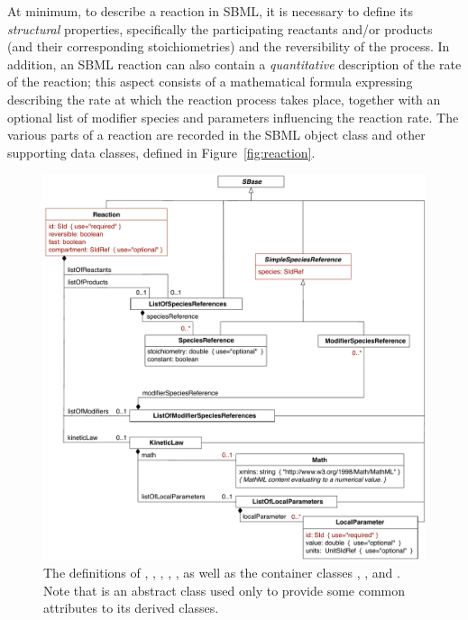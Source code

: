 At minimum, to describe a reaction in SBML, it is necessary to
define its \emph{structural} properties, specifically the
participating reactants and/or products (and their corresponding
stoichiometries) and the reversibility of the process.  In
addition, an SBML reaction can also contain a \emph{quantitative}
description of the rate of the reaction; this aspect consists of a
mathematical formula expressing describing the rate at which the
reaction process takes place, together with an optional list of
modifier species and parameters influencing the reaction rate.
The various parts of a reaction are recorded in the SBML \Reaction
object class and other supporting data classes, defined in
Figure~\vref{fig:reaction}.

\begin{figure}[b]
  \centering
  \includegraphics[scale=0.78]{figs/reaction-uml-v2}
  \caption{The definitions of \Reaction, \KineticLaw,
    \SpeciesReference, \ModifierSpeciesReference, \LocalParameter,
    as well as the container classes \ListOfSpeciesReferences,
    \ListOfModifierSpeciesReferences, and \ListOfLocalParameters.
    Note that \SimpleSpeciesReferenceUpright is an abstract class used
    only to provide some common attributes to its derived
    classes.}
  \label{fig:reaction}
\end{figure}


